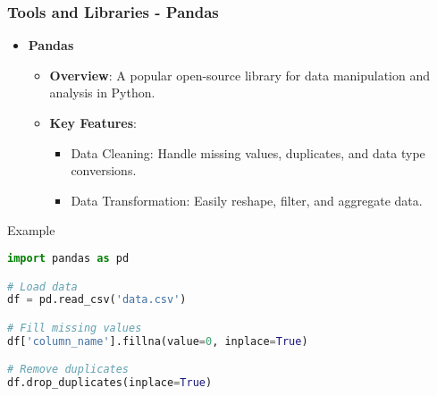 \documentclass[aspectratio=169]{beamer}
\begin{document}
\begin{frame}[fragile]
    \frametitle{Tools and Libraries - Pandas}
    \begin{itemize}
        \item \textbf{Pandas}
        \begin{itemize}
            \item \textbf{Overview}: A popular open-source library for data manipulation and analysis in Python.
            \item \textbf{Key Features}:
            \begin{itemize}
                \item Data Cleaning: Handle missing values, duplicates, and data type conversions.
                \item Data Transformation: Easily reshape, filter, and aggregate data.
            \end{itemize}
        \end{itemize}
    \end{itemize}
    
    \begin{block}{Example}
        \begin{lstlisting}[language=Python]
import pandas as pd

# Load data
df = pd.read_csv('data.csv')

# Fill missing values
df['column_name'].fillna(value=0, inplace=True)

# Remove duplicates
df.drop_duplicates(inplace=True)
        \end{lstlisting}
    \end{block}
\end{frame}
\end{document}
